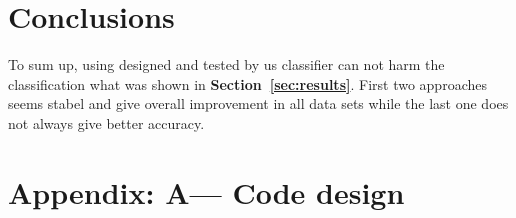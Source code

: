 \documentclass[12pt, a4paper, pdflatex]{report}
\begin{document}
\section{Conclusions}
To sum up, using designed and tested by us classifier can not harm the classification what was shown in \textbf{Section~\ref{sec:results}}.
First two approaches seems stabel and give overall improvement in all data sets while the last one does not always  give better accuracy.


\clearpage
\newpage
\section*{Appendix: A--- Code design\label{ap:code}}




{}
\end{document}

